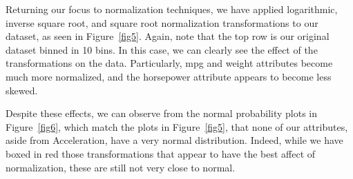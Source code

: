 \documentclass[10pt, conference, compsocconf]{IEEEtran}
\begin{document}
Returning our focus to normalization techniques, we have applied logarithmic, inverse square root, and square root normalization transformations to our dataset, as seen in Figure~\ref{fig5}. Again, note that the top row is our original dataset binned in 10 bins. In this case, we can clearly see the effect of the transformations on the data. Particularly, mpg and weight attributes become much more normalized, and the horsepower attribute appears to become less skewed. 

Despite these effects, we can observe from the normal probability plots in Figure~\ref{fig6}, which match the plots in Figure~\ref{fig5}, that none of our attributes, aside from Acceleration, have a very normal distribution. Indeed, while we have boxed in red those transformations that appear to have the best affect of normalization, these are still not very close to normal. 
\end{document}
